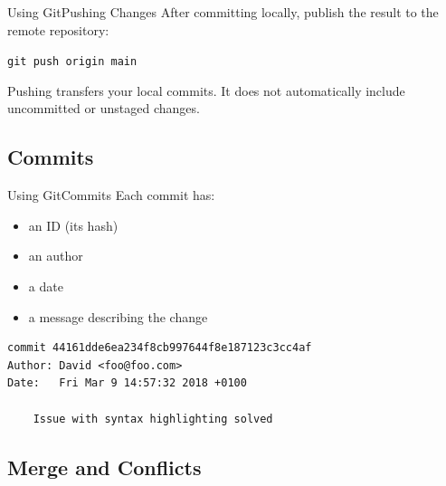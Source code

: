 \documentclass[10pt,compress]{beamer}
\begin{document}
\begin{frame}{Using Git}{Pushing Changes}
After committing locally, publish the result to the remote repository:

\bigskip

\texttt{git push origin main}

\bigskip

Pushing transfers your local commits. It does not automatically include uncommitted or unstaged changes.
\end{frame}

\subsection{Commits}

\begin{frame}[fragile]{Using Git}{Commits}
Each commit has:
\begin{itemize}
 \item an ID (its hash)
 \item an author
 \item a date
 \item a message describing the change
\end{itemize}

\begin{verbatim}
commit 44161dde6ea234f8cb997644f8e187123c3cc4af
Author: David <foo@foo.com>
Date:   Fri Mar 9 14:57:32 2018 +0100

    Issue with syntax highlighting solved
\end{verbatim}
\end{frame}

\subsection{Merge and Conflicts}
\end{document}
